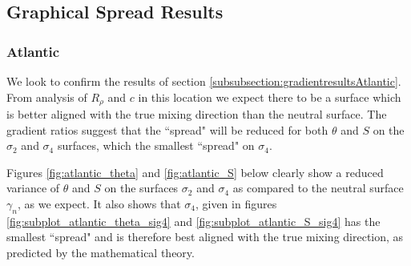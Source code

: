 \subsection{Graphical Spread Results}
\label{subsection:spreadresults}
\subsubsection{Atlantic}
\label{subsubsection:spreadresultsAtlantic}

We look to confirm the results of section \ref{subsubsection:gradientresultsAtlantic}. From analysis of $R_\rho$ and $c$ in this location we expect there to be a surface which is better aligned with the true mixing direction than the neutral surface. The gradient ratios suggest that the ``spread" will be reduced for both $\theta$ and $S$ on the $\sigma_2$ and $\sigma_4$ surfaces, which the smallest ``spread" on $\sigma_4$.

Figures \ref{fig:atlantic_theta} and \ref{fig:atlantic_S} below clearly show a reduced variance of $\theta$ and $S$ on the surfaces $\sigma_2$ and $\sigma_4$ as compared to the neutral surface $\gamma_n$, as we expect. It also shows that $\sigma_4$, given in figures \ref{fig:subplot_atlantic_theta_sig4} and \ref{fig:subplot_atlantic_S_sig4} has the smallest ``spread" and is therefore best aligned with the true mixing direction, as predicted by the mathematical theory. 

